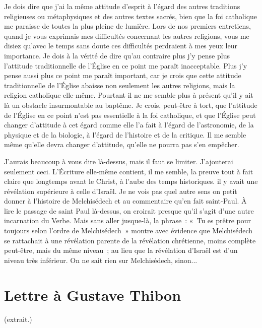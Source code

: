 \documentclass[french,twoside]{book} %
\newcommand\chapteropen{} %
\newcommand\chaptercont{} %
\newcommand\chapterclose{} %
\begin{document}
Je dois dire que j'ai la même attitude d'esprit à l'égard des autres traditions religieuses ou métaphysiques et des autres textes sacrés, bien que la foi catholique me paraisse de toutes la plus pleine de lumière. Lors de nos premiers entretiens, quand je vous exprimais mes difficultés concernant les autres religions, vous me disiez qu'avec le temps sans doute ces difficultés perdraient à mes yeux leur importance. Je dois à la vérité de dire qu'au contraire plus j'y pense plus l'attitude traditionnelle de l'Église en ce point me paraît inacceptable. Plus j'y pense aussi plus ce point me paraît important, car je crois que cette attitude traditionnelle de l'Église abaisse non seulement les autres religions, mais la religion catholique elle-même. Pourtant il ne me semble plus à présent qu'il y ait là un obstacle insurmontable au baptême. Je crois, peut-être à tort, que l'attitude de l'Église en ce point n'est pas essentielle à la foi catholique, et que l'Église peut changer d'attitude à cet égard comme elle l'a fait à l'égard de l'astronomie, de la physique et de la biologie, à l'égard de l'histoire et de la critique. Il me semble même qu'elle devra changer d'attitude, qu'elle ne pourra pas s'en empêcher.\par
J'aurais beaucoup à vous dire là-dessus, mais il faut se limiter. J'ajouterai seulement ceci. L'Écriture elle-même contient, il me semble, la preuve tout à fait claire que longtemps avant le Christ, à l'aube des temps historiques. il y avait une révélation supérieure à celle d'Israël. Je ne vois pas quel autre sens on petit donner à l'histoire de Melchisédech et au commentaire qu'en fait saint-Paul. À lire le passage de saint Paul là-dessus, on croirait presque qu'il s'agit d'une autre incarnation du Verbe. Mais sans aller jusque-là, la phrase : « Tu es prêtre pour toujours selon l'ordre de Melchisédech » montre avec évidence que Melchisédech se rattachait à une révélation parente de la révélation chrétienne, moins complète peut-être, mais du même niveau ; au lieu que la révélation d'Israël est d'un niveau très inférieur. On ne sait rien sur Melchisédech, sinon...
\chapterclose


\chapteropen
\chapter[{Lettre à Gustave Thibon}]{Lettre à Gustave Thibon}

\chaptercont

\begin{center}
\noindent \centerline{(extrait.)}\par
\end{center}
\end{document}
